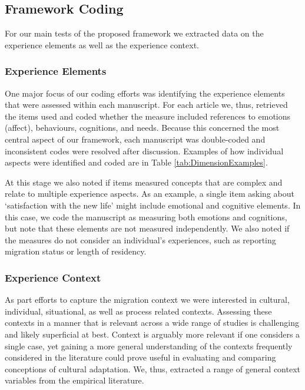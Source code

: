 \documentclass[man, 12pt, a4paper]{apa7}
\begin{document}
\subsection{Framework Coding}
For our main tests of the proposed framework we extracted data on the experience elements as well as the experience context.
\subsubsection{Experience Elements}
One major focus of our coding efforts was identifying the experience elements that were assessed within each manuscript. For each article we, thus, retrieved the items used and coded whether the measure included references to emotions (affect), behaviours, cognitions, and needs. Because this concerned the most central aspect of our framework, each manuscript was double-coded and inconsistent codes were resolved after discussion. Examples of how individual aspects were identified and coded are in Table \ref{tab:DimensionExamples}.


At this stage we also noted if items measured concepts that are complex and relate to multiple experience aspects. As an example, a single item asking about `satisfaction with the new life' might include emotional and cognitive elements. In this case, we code the manuscript as measuring both emotions and cognitions, but note that these elements are not measured independently. We also noted if the measures do not consider an individual's experiences, such as reporting migration status or length of residency.

\subsubsection{Experience Context}
As part efforts to capture the migration context we were interested in cultural, individual, situational, as well as process related contexts. Assessing these contexts in a manner that is relevant across a wide range of studies is challenging and likely superficial at best. Context is arguably more relevant if one considers a single case, yet gaining a more general understanding of the contexts frequently considered in the literature could prove useful in evaluating and comparing conceptions of cultural adaptation. We, thus, extracted a range of general context variables from the empirical literature.
\end{document}
